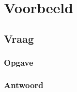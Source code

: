 \documentclass[indexstructuren.tex]{subfiles}
\begin{document}
\chapter{Voorbeeld}
\renewcommand\thesection{V\arabic{section}}
\renewcommand\thesubsection{V\arabic{section}}
\section{Vraag}
\subsection*{Opgave}
\subsection*{Antwoord}
\end{document}
